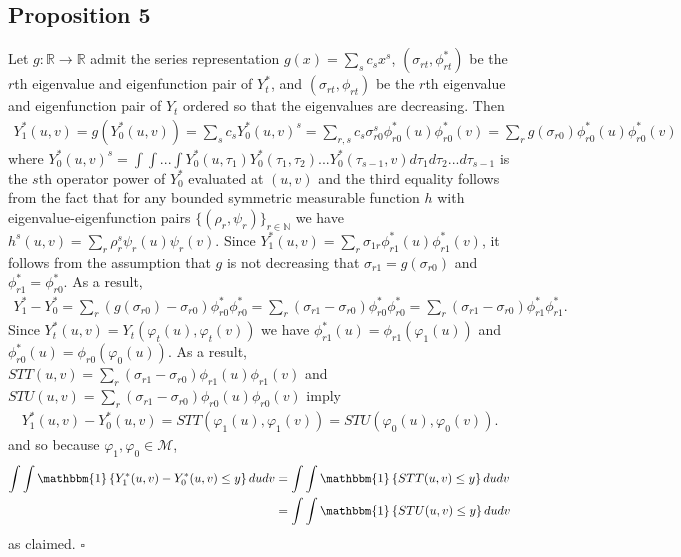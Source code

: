 \documentclass[12pt]{article}
\theoremstyle{definition}
\begin{document}
\subsection{Proposition 5}
Let $g: \mathbb{R} \to \mathbb{R}$ admit the series representation $g(x) = \sum_{s}c_{s}x^{s}$, $(\sigma_{rt},\phi^{*}_{rt})$ be the $r$th eigenvalue and eigenfunction pair of $Y_{t}^{*}$, and $(\sigma_{rt},\phi_{rt})$ be the $r$th eigenvalue and eigenfunction pair of $Y_{t}$ ordered so that the eigenvalues are decreasing. 
 Then 
\begin{align*}
Y_{1}^{*}(u,v) = g(Y_{0}^{*}(u,v)) = \sum_{s}c_{s}Y_{0}^{*}(u,v)^{s} 
= \sum_{r,s}c_{s}\sigma_{r0}^{s}\phi^{*}_{r0}(u)\phi^{*}_{r0}(v) =  \sum_{r}g(\sigma_{r0})\phi^{*}_{r0}(u)\phi^{*}_{r0}(v)
\end{align*}
where $Y_{0}^{*}(u,v)^{s}  = \int\int...\int Y_{0}^{*}(u,\tau_{1})Y_{0}^{*}(\tau_{1},\tau_{2})...Y_{0}^{*}(\tau_{s-1},v)d\tau_{1}d\tau_{2}...d\tau_{s-1}$ is the $s$th operator power of $Y_{0}^{*}$ evaluated at $(u,v)$ and the third equality follows from the fact that for any bounded symmetric measurable function $h$ with eigenvalue-eigenfunction pairs $\{(\rho_{r},\psi_{r})\}_{r \in \mathbb{N}}$ we have $h^{s}(u,v) = \sum_{r}\rho_{r}^{s}\psi_{r}(u)\psi_{r}(v)$. Since $Y_{1}^{*}(u,v) = \sum_{r}\sigma_{1r}\phi^{*}_{r1}(u)\phi^{*}_{r1}(v)$, it follows from  the assumption that $g$ is not decreasing that $\sigma_{r1} = g(\sigma_{r0})$ and $\phi^{*}_{r1} = \phi^{*}_{r0}$. As a result,
\begin{align*}
Y^{*}_{1}-Y_{0}^{*} = \sum_{r}(g(\sigma_{r0}) - \sigma_{r0})\phi^{*}_{r0}\phi^{*}_{r0}
 =  \sum_{r}\left(\sigma_{r1}-\sigma_{r0}\right)\phi^{*}_{r0}\phi^{*}_{r0}
 =  \sum_{r}\left(\sigma_{r1}-\sigma_{r0}\right)\phi^{*}_{r1}\phi^{*}_{r1}.
\end{align*}
Since $Y_{t}^{*}(u,v) = Y_{t}(\varphi_{t}(u),\varphi_{t}(v))$ we have  $\phi^{*}_{r1}(u) = \phi_{r1}(\varphi_{1}(u))$ and  $\phi^{*}_{r0}(u) = \phi_{r0}(\varphi_{0}(u))$. As a result, $STT(u,v) =  \sum_{r}\left(\sigma_{r1}-\sigma_{r0}\right)\phi_{r1}(u)\phi_{r1}(v)$ and $STU(u,v) =  \sum_{r}\left(\sigma_{r1}-\sigma_{r0}\right)\phi_{r0}(u)\phi_{r0}(v)$ imply
\begin{align*}
Y^{*}_{1}(u,v)-Y_{0}^{*}(u,v) = STT(\varphi_{1}(u),\varphi_{1}(v))= STU(\varphi_{0}(u),\varphi_{0}(v)).
\end{align*}
and so because $\varphi_{1},\varphi_{0} \in \mathcal{M}$,
\begin{align*}
\int\int\mathbbm{1}\left\{Y^{*}_{1}(u,v)-Y_{0}^{*}(u,v)  \leq y\right\} dudv
&= \int\int\mathbbm{1}\left\{STT(u,v) \leq y\right\}dudv \\
&= \int\int\mathbbm{1}\left\{STU(u,v) \leq y\right\} dudv
\end{align*}
as claimed. $\square$
\end{document}
